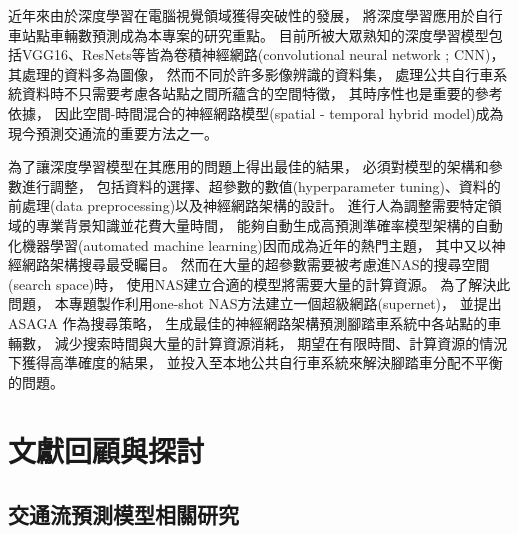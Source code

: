 \documentclass[a4paper,14pt]{extarticle}
\begin{document}
        近年來由於深度學習在電腦視覺領域獲得突破性的發展\cite{8114708}，
        將深度學習應用於自行車站點車輛數預測成為本專案的研究重點。
        目前所被大眾熟知的深度學習模型包括VGG16\cite{simonyan2014very}、ResNets\cite{he2016deep}等皆為卷積神經網路(convolutional neural network ; CNN)，
        其處理的資料多為圖像，
        然而不同於許多影像辨識的資料集，
        處理公共自行車系統資料時不只需要考慮各站點之間所蘊含的空間特徵，
        其時序性也是重要的參考依據，
        因此空間-時間混合的神經網路模型(spatial - temporal hybrid model)成為現今預測交通流的重要方法之一。
     
        為了讓深度學習模型在其應用的問題上得出最佳的結果，
        必須對模型的架構和參數進行調整，
        包括資料的選擇、超參數的數值(hyperparameter tuning)\cite{10.5555/2986459.2986743}、資料的前處理(data preprocessing)\cite{kotsiantis2006data}\cite{famili1997data}以及神經網路架構的設計。
        進行人為調整需要特定領域的專業背景知識並花費大量時間，
        能夠自動生成高預測準確率模型架構的自動化機器學習(automated machine learning)\cite{WARING2020101822}因而成為近年的熱門主題，
        其中又以神經網路架構搜尋\cite{elsken2019neural}最受矚目。
        然而在大量的超參數需要被考慮進NAS的搜尋空間(search space)時，
        使用NAS建立合適的模型將需要大量的計算資源\cite{zhao2020simplifying}。
        為了解決此問題，
        本專題製作利用one-shot NAS方法\cite{pmlr-v80-bender18a}建立一個超級網路(supernet)，
        並提出 ASAGA 作為搜尋策略，
        生成最佳的神經網路架構預測腳踏車系統中各站點的車輛數，
        減少搜索時間與大量的計算資源消耗，
        期望在有限時間、計算資源的情況下獲得高準確度的結果，
        並投入至本地公共自行車系統來解決腳踏車分配不平衡的問題。
    \newpage

    \section{文獻回顧與探討}
        \subsection{交通流預測模型相關研究}
            
\end{document}

